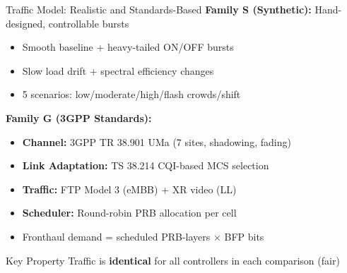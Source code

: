 \documentclass[aspectratio=169]{beamer}
\begin{document}
\begin{frame}{Traffic Model: Realistic and Standards-Based}
\textbf{Family S (Synthetic):} Hand-designed, controllable bursts
\begin{itemize}
    \item Smooth baseline + heavy-tailed ON/OFF bursts
    \item Slow load drift + spectral efficiency changes
    \item 5 scenarios: low/moderate/high/flash crowds/shift
\end{itemize}

\vspace{0.3cm}
\textbf{Family G (3GPP Standards):}
\begin{itemize}
    \item \textbf{Channel:} 3GPP TR 38.901 UMa (7 sites, shadowing, fading)
    \item \textbf{Link Adaptation:} TS 38.214 CQI-based MCS selection
    \item \textbf{Traffic:} FTP Model 3 (eMBB) + XR video (LL)
    \item \textbf{Scheduler:} Round-robin PRB allocation per cell
    \item Fronthaul demand = scheduled PRB-layers × BFP bits
\end{itemize}

\vspace{0.2cm}
\begin{alertblock}{Key Property}
Traffic is \textbf{identical} for all controllers in each comparison (fair)
\end{alertblock}
\end{frame}
\end{document}
